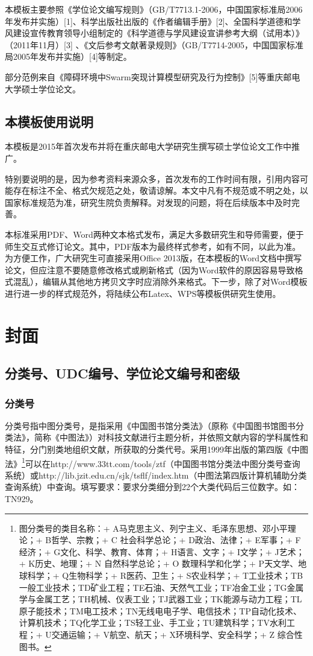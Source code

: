 \documentclass{cqupt_thesis}
\begin{document}
    本模板主要参照《学位论文编写规则》（GB/T7713.1-2006，中国国家标准局2006年发布并实施）[1]、科学出版社出版的《作者编辑手册》[2]、全国科学道德和学风建设宣传教育领导小组制定的《科学道德与学风建设宣讲参考大纲（试用本）》（2011年11月）[3] 、《文后参考文献著录规则》（GB/T7714-2005，中国国家标准局2005年发布并实施）[4]等制定。

    部分范例来自《障碍环境中Swarm突现计算模型研究及行为控制》[5]等重庆邮电大学硕士学位论文。

    \subsection{本模板使用说明}
    本模板是2015年首次发布并将在重庆邮电大学研究生撰写硕士学位论文工作中推广。

    特别要说明的是，因为参考资料来源众多，首次发布的工作时间有限，引用内容可能存在标注不全、格式欠规范之处，敬请谅解。本文中凡有不规范或不明之处，以国家标准规范为准，研究生院负责解释。对发现的问题，将在后续版本中及时完善。

    本标准采用PDF、Word两种文本格式发布，满足大多数研究生和导师需要，便于师生交互式修订论文。其中，PDF版本为最终样式参考，如有不同，以此为准。为方便工作，广大研究生可直接采用Office 2013版，在本模板的Word文档中撰写论文，但应注意不要随意修改格式或刷新格式（因为Word软件的原因容易导致格式混乱），编辑从其他地方拷贝文字时应消除外来格式。下一步，除了对Word模板进行进一步的样式规范外，将陆续公布Latex、WPS等模板供研究生使用。


    \section{封面}

    \subsection{分类号、UDC编号、学位论文编号和密级}

    \subsubsection{分类号}
    分类号指中图分类号，是指采用《中国图书馆分类法》（原称《中国图书馆图书分类法》，简称《中图法》）对科技文献进行主题分析，并依照文献内容的学科属性和特征，分门别类地组织文献，所获取的分类代号。采用1999年出版的第四版《中图法》\footnote{
        图分类号的类目名称：+ A马克思主义、列宁主义、毛泽东思想、邓小平理论；+ B哲学、宗教；+ C 社会科学总论；+ D政治、法律；+ E军事；+ F经济；+ G文化、科学、教育、体育；+ H语言、文字；+ I文学；+ J艺术；+ K历史、地理；+ N 自然科学总论；+ O 数理科学和化学；+ P天文学、地球科学；+ Q生物科学；+ R医药、卫生；+ S农业科学；+ T工业技术；TB一般工业技术；TD矿业工程；TE石油、天然气工业；TF冶金工业；TG金属学与金属工艺；TH机械、仪表工业；TJ武器工业；TK能源与动力工程；TL原子能技术；TM电工技术；TN无线电电子学、电信技术；TP自动化技术、计算机技术；TQ化学工业；TS轻工业、手工业；TU建筑科学；TV水利工程；+ U交通运输；+ V航空、航天；+ X环境科学、安全科学；+ Z 综合性图书。}可以在http://www.33tt.com/tools/ztf（中国图书馆分类法中图分类号查询系统）或http://lib.jzit.edu.cn/sjk/tsflf/index.htm（中图法第四版计算机辅助分类查询系统）中查询。填写要求：要求分类细分到22个大类代码后三位数字。如：TN929。
\end{document}
